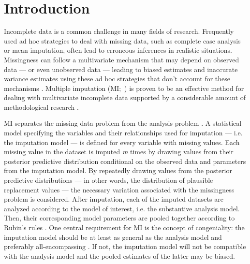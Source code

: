\documentclass[3p,12pt,a4paper]{elsarticle}
\begin{document}
\section{Introduction}
Incomplete data is a common challenge in many fields of research. Frequently used ad hoc strategies to deal with missing data, such as complete case analysis or mean imputation, often lead to erroneous inferences in realistic situations. Missingness can follow a multivariate mechanism that may depend on observed data --- or even unobserved data --- leading to biased estimates and inaccurate variance estimates using these ad hoc strategies that don't account for these mechanisms \citep{buurenFlexibleImputationMissing2018, kang2013, enders2017, austin2021, little2002}. Multiple imputation (MI;~) is proven to be an effective method for dealing with multivariate incomplete data supported by a considerable amount of methodological research \citep{mistlerComparisonJointModel2017, buurenFlexibleImputationMissing2018, enders2017, burgette2010, austin2021, audigier2018, vanbuuren2007, grund2021, hughes2014, little2002}.

MI separates the missing data problem from the analysis problem \citep{mistlerComparisonJointModel2017, buurenFlexibleImputationMissing2018, enders2017, burgette2010, austin2021, audigier2018, vanbuuren2007, grund2021, hughes2014, little2002, carpenter2013, bartlett2015}. A statistical model specifying the variables and their relationships used for imputation --- i.e. the imputation model --- is defined for every variable with missing values. Each missing value in the dataset is imputed \textit{m} times by drawing values from their posterior predictive distribution conditional on the observed data and parameters from the imputation model. By repeatedly drawing values from the posterior predictive distributions --- in other words, the distribution of plausible replacement values --- the necessary variation associated with the missingness problem is considered. After imputation, each of the imputed datasets are analyzed according to the model of interest, i.e. the substantive analysis model. Then, their corresponding model parameters are pooled together according to Rubin's rules \citep{rubin1987}. 
One central requirement for MI is the concept of congeniality: the imputation model should be at least as general as the analysis model and preferably all-encompassing \citep{grund2018, enders2018, meng1994multiple, bartlett2015, grund2016, little2002}. If not, the imputation model will not be compatible with the analysis model and the pooled estimates of the latter may be biased. 
\end{document}
